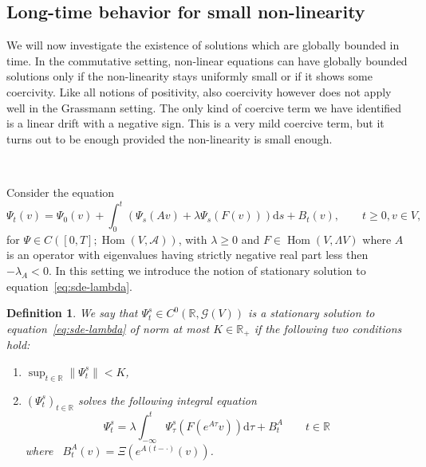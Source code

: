 \documentclass{article}
\newcommand{\mathd}{\mathrm{d}}
\newcommand{\tmop}[1]{\ensuremath{\operatorname{#1}}}
\newtheorem{definition}[theorem]{Definition}
\begin{document}
\subsection{Long-time behavior for small non-linearity}

We will now investigate the existence of solutions which are globally bounded
in time. In the commutative setting, non-linear equations can have globally
bounded solutions only if the non-linearity stays uniformly small or if it
shows some coercivity. Like all notions of positivity, also coercivity however
does not apply well in the Grassmann setting. The only kind of coercive term
we have identified is a linear drift with a negative sign. This is a very mild
coercive term, but it turns out to be enough provided the non-linearity is
small enough.

\

Consider the equation
\begin{equation}
  \Psi_t (v) = \Psi_0 (v) + \int_0^t (\Psi_s (A v) + \lambda \Psi_s (F (v)))
  \mathd s + B_t (v), \qquad t \geqslant 0, v \in V, \label{eq:sde-lambda}
\end{equation}
for $\Psi \in C ([0, T] ; \tmop{Hom} (V, \mathcal{A}))$, with $\lambda
\geqslant 0$ and $F \in \tmop{Hom} (V, \Lambda V)$ where $A$ is an operator
with eigenvalues having strictly negative real part less then $- \lambda_A <
0$. In this setting we introduce the notion of stationary solution to
equation~{\eqref{eq:sde-lambda}}.

\begin{definition}
  We say that $\Psi^s_t \in C^0 (\mathbb{R}, \mathcal{G} (V))$ is a stationary
  solution to equation~{\eqref{eq:sde-lambda}} of norm at most $K \in
  \mathbb{R}_+$ if the following two conditions hold:
  \begin{enumerate}
    \item $\sup_{t \in \mathbb{R}} \| \Psi^s_t \| < K$,
    
    \item $(\Psi^s_t)_{t \in \mathbb{R}}$ solves the following integral
    equation
    \begin{equation}
      \Psi^s_t = \lambda \int_{- \infty}^t \Psi^s_{\tau} (F (e^{A \tau} v))
      \mathd \tau + B^A_t \label{eq:stationary} \qquad t \in \mathbb{R}
    \end{equation}
    where \ $B^A_t (v) = \Xi (e^{A (t - \cdot)} (v))$.
  \end{enumerate}
\end{definition}
\end{document}

